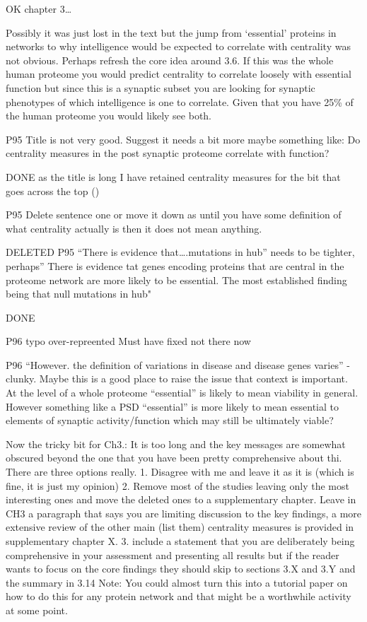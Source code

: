 OK chapter 3…

Possibly it was just lost in the text but the jump from ‘essential’ proteins in networks to why intelligence would be expected to correlate with centrality was not obvious. Perhaps refresh the core idea around 3.6.
If this was the whole human proteome you would predict centrality to correlate loosely with essential function but since this is a synaptic subset you are looking for synaptic phenotypes of which intelligence is one to correlate. Given that you have 25\% of the human proteome you would likely see both.

P95 Title is not very good. Suggest it needs a bit more maybe something like: Do centrality measures in the post synaptic proteome correlate with function?

DONE as the title is long I have retained centrality measures for the bit that goes across the top (\chaptermark{})


P95 Delete sentence one or move it down as until you have some definition of what centrality actually is then it does not mean anything.

DELETED
P95 “There is evidence that….mutations in hub” needs to be tighter, perhaps” There is evidence tat genes encoding proteins that are central in the proteome network are more likely to be essential. The most established finding being that null mutations in hub"

DONE


P96 typo over-repreented
Must have fixed not there now

P96 “However. the definition of variations in disease and disease genes varies” - clunky. Maybe this is a good place to raise the issue that context is important. At the level of a whole proteome “essential” is likely to mean viability in general. However something like a PSD “essential” is more likely to mean essential to elements of synaptic activity/function which may still be ultimately viable?

Now the tricky bit for Ch3.: It is too long and the key messages are somewhat obscured beyond the one that you have been pretty comprehensive about thi. There are three options really.
1. Disagree with me and leave it as it is (which is fine, it is just my opinion)
2. Remove most of the studies leaving only the most interesting ones and move the deleted ones to a supplementary chapter. Leave in CH3 a paragraph that says you are limiting discussion to the key findings, a more extensive review of the other main (list them) centrality measures is provided in supplementary chapter X.
3. include a statement that you are deliberately being comprehensive in your assessment and presenting all results but if the reader wants to focus on the core findings they should skip to sections 3.X and 3.Y and the summary in 3.14
Note: You could almost turn this into a tutorial paper on how to do this for any protein network and that might be a worthwhile activity at some point.

